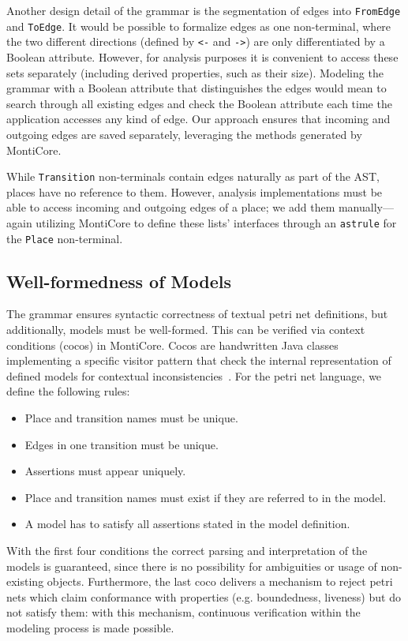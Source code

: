 Another design detail of the grammar is the segmentation of edges into \texttt{FromEdge} and \texttt{ToEdge}. It would be possible to formalize edges as one non-terminal, where the two different directions (defined by \texttt{<-} and \texttt{->}) are only differentiated by a Boolean attribute. However, for analysis purposes it is convenient to access these sets separately (including derived properties, such as their size). Modeling the grammar with a Boolean attribute that distinguishes the edges would mean to search through all existing edges and check the Boolean attribute each time the application accesses any kind of edge. Our approach ensures that incoming and outgoing edges are saved separately, leveraging the methods generated by MontiCore.

While \texttt{Transition} non-terminals contain edges naturally as part of the AST, places have no reference to them. However, analysis implementations must be able to access incoming and outgoing edges of a place; we add them manually---again utilizing MontiCore to define these lists' interfaces through an \texttt{astrule} for the \texttt{Place} non-terminal.

\subsection{Well-formedness of Models}\label{sec:lang:semantics}

The grammar ensures syntactic correctness of textual petri net definitions, but additionally, models must be well-formed. This can be verified via context conditions (cocos) in MontiCore. Cocos are handwritten Java classes implementing a specific visitor pattern that check the internal representation of defined models for contextual inconsistencies~\cite{rumpe2017monticore}. For the petri net language, we define the following rules:

\begin{itemize}
    \item Place and transition names must be unique.
    \item Edges in one transition must be unique.
    \item Assertions must appear uniquely.
    \item Place and transition names must exist if they are referred to in the model.
    \item A model has to satisfy all assertions stated in the model definition.
\end{itemize}

With the first four conditions the correct parsing and interpretation of the models is guaranteed, since there is no possibility for ambiguities or usage of non-existing objects. Furthermore, the last coco delivers a mechanism to reject petri nets which claim conformance with properties (e.g. boundedness, liveness) but do not satisfy them: with this mechanism, continuous verification within the modeling process is made possible.
